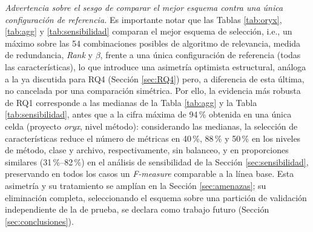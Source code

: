 \documentclass[conference,a4paper]{IEEEtran}
\begin{document}
\textit{Advertencia sobre el sesgo de comparar el mejor esquema contra una única configuración de referencia.} Es importante notar que las Tablas \ref{tab:oryx}, \ref{tab:agg} y \ref{tab:sensibilidad} comparan el mejor esquema de selección, i.e., un máximo sobre las 54 combinaciones posibles de algoritmo de relevancia, medida de redundancia, \textit{Rank} y $\beta$, frente a una única configuración de referencia (todas las características), lo que introduce una asimetría optimista estructural, análoga a la ya discutida para RQ4 (Sección \ref{sec:RQ4}) pero, a diferencia de esta última, no cancelada por una comparación simétrica. Por ello, la evidencia más robusta de RQ1 corresponde a las medianas de la Tabla \ref{tab:agg} y la Tabla \ref{tab:sensibilidad}, antes que a la cifra máxima de 94\,\% obtenida en una única celda (proyecto \textit{oryx}, nivel método): considerando las medianas, la selección de características reduce el número de métricas en 40\,\%, 88\,\% y 50\,\% en los niveles de método, clase y archivo, respectivamente, sin balanceo, y en proporciones similares (31\,\%--82\,\%) en el análisis de sensibilidad de la Sección \ref{sec:sensibilidad}, preservando en todos los casos un \textit{F-measure} comparable a la línea base. Esta asimetría y su tratamiento se amplían en la Sección \ref{sec:amenazas}; su eliminación completa, seleccionando el esquema sobre una partición de validación independiente de la de prueba, se declara como trabajo futuro (Sección \ref{sec:conclusiones}).

\begin{table}[H]
\caption{Mejor resultado por nivel (proyecto \textit{oryx}): características originales vs. seleccionadas}
\label{tab:oryx}
\centering
{}
\end{table}

\begin{table}[H]
\caption{Mejor \textit{F-measure} por proyecto agregado sobre los 15 proyectos individuales (mediana [mín--máx])}
\label{tab:agg}
\centering
{}
\end{table}
\end{document}
